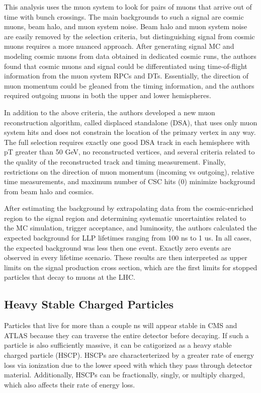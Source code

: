 \documentclass[12pt]{article}
\begin{document}
    This analysis uses the muon system to look for pairs of muons that arrive out of time with bunch crossings. The main backgrounds to such a signal are cosmic muons, beam halo, and muon system noise. Beam halo and muon system noise are easily removed by the selection criteria, but distinguishing signal from cosmic muons requires a more nuanced approach. After generating signal MC and modeling cosmic muons from data obtained in dedicated cosmic runs, the authors found that cosmic muons and signal could be differentiated using time-of-flight information from the muon system RPCs and DTs. Essentially, the direction of muon momentum could be gleaned from the timing information, and the authors required outgoing muons in both the upper and lower hemispheres.  
    
    In addition to the above criteria, the authors developed a new muon reconstruction algorithm, called displaced standalone (DSA), that uses only muon system hits and does not constrain the location of the primary vertex in any way. The full selection requires exactly one good DSA track in each hemisphere with pT greater than 50 GeV, no reconstructed vertices, and several criteria related to the quality of the reconstructed track and timing measurement. Finally, restrictions on the direction of muon momentum (incoming vs outgoing), relative time measurements, and maximum number of CSC hits (0) minimize background from beam halo and cosmics.

    After estimating the background by extrapolating data from the cosmic-enriched region to the signal region and determining systematic uncertainties related to the MC simulation, trigger acceptance, and luminosity, the authors calculated the expected background for LLP lifetimes ranging from 100 ns to 1 us. In all cases, the expected background was less then one event. Exactly zero events are observed in every lifetime scenario. These results are then interpreted as upper limits on the signal production cross section, which are the first limits for stopped particles that decay to muons at the LHC.

\subsection{Heavy Stable Charged Particles}
    Particles that live for more than a couple ns  will appear stable in CMS and ATLAS because they can traverse the entire detector before decaying. If such a particle is also sufficiently massive, it can be catigorized as a heavy stable charged particle (HSCP). HSCPs are characterterized by a greater rate of energy loss via ionization due to the lower speed with which they pass through detector material. Additionally, HSCPs can be fractionally, singly, or multiply charged, which also affects their rate of energy loss. 
\end{document}
